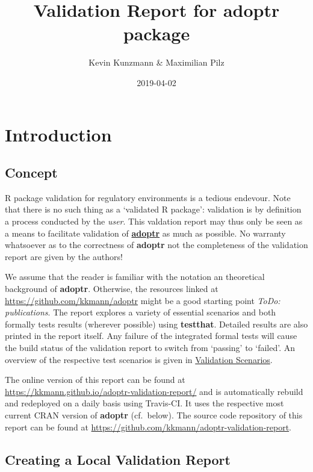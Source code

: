 \documentclass[]{book}
\title{Validation Report for \textbf{adoptr} package}
\author{Kevin Kunzmann \& Maximilian Pilz}
\date{2019-04-02}
\begin{document}
\maketitle

{
\setcounter{tocdepth}{1}
\tableofcontents
}
\hypertarget{introduction}{%
\chapter{Introduction}\label{introduction}}

\hypertarget{concept}{%
\section{Concept}\label{concept}}

R package validation for regulatory environments is a tedious endevour.
Note that there is no such thing as a `validated R package':
validation is by definition a process conducted by the \emph{user}.
This valdation report may thus only be seen as a means to facilitate
validation of \textbf{\href{https://github.com/kkmann/adoptr}{adoptr}} as much as possible.
No warranty whatsoever as to the correctness of \textbf{adoptr} not the
completeness of the validation report are given by the authors!

We assume that the reader is familiar with the notation an theoretical
background of \textbf{adoptr}.
Otherwise, the resources linked at \url{https://github.com/kkmann/adoptr} might
be a good starting point \emph{ToDo: publications}.
The report explores a variety of essential scenarios and both formally
tests results (wherever possible) using \textbf{testthat}.
Detailed results are also printed in the report itself.
Any failure of the integrated formal tests will cause the build status
of the validation report to switch from `passing' to `failed'.
An overview of the respective test scenarios is given in \protect\hyperlink{validation-scenarios}{Validation Scenarios}.

The online version of this report can be found at
\url{https://kkmann.github.io/adoptr-validation-report/} and is automatically
rebuild and redeployed on a daily basis using Travis-CI.
It uses the respective most current CRAN version of \textbf{adoptr} (cf.~below).
The source code repository of this report can be found at
\url{https://github.com/kkmann/adoptr-validation-report}.

\hypertarget{creating-a-local-validation-report}{%
\section{Creating a Local Validation Report}\label{creating-a-local-validation-report}}
\end{document}
